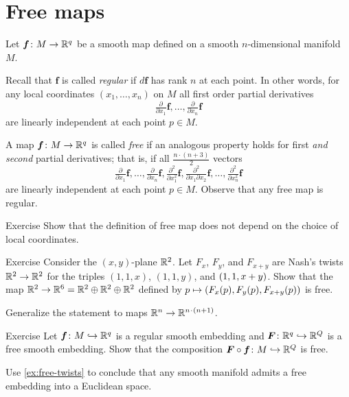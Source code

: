 \section{Free maps}

Let $\bm{f}\colon M\to \mathbb{R}^q$ be a smooth map defined on a smooth $n$-dimensional manifold $M$.

Recall that $\bm{f}$ is called \emph{regular} if $d\bm{f}$ has rank $n$ at each point.
In other words, for any local coordinates $(x_1,\dots,x_n)$ on $M$ all first order partial derivatives
\[\tfrac{\partial}{\partial x_1}\bm{f},\dots,\tfrac{\partial}{\partial x_n}\bm{f}\]
are linearly independent at each point $p\in M$.

A map $\bm{f}\colon M\to \mathbb{R}^q$ is called \emph{free} if an analogous property holds for first \emph{and second} partial derivatives;
that is, if all $\tfrac{n\cdot(n+3)}{2}$ vectors
\[\tfrac{\partial}{\partial x_1}\bm{f},
\dots,
\tfrac{\partial}{\partial x_n}\bm{f},
\tfrac{\partial^2}{\partial x_1^2}\bm{f},
\tfrac{\partial^2}{\partial x_1\partial x_2}\bm{f},
\dots,
\tfrac{\partial^2}{\partial x_n^2}\bm{f}\]
are linearly independent at each point $p\in M$.
Observe that any free map is regular.

\begin{thm}{Exercise}\label{ex:free-def}
Show that the definition of free map does not depend on the choice of local coordinates. 
\end{thm}

\begin{thm}{Exercise}\label{ex:free-twists}
Consider the $(x,y)$-plane $\mathbb{R}^2$.
Let $F_x$, $F_y$, and $F_{x+y}$ are Nash's twists $\mathbb{R}^2\to \mathbb{R}^2$ for the triples $(1,1,x)$, $(1,1,y)$, and $(1,1,x\z+y)$.
Show that the map $\mathbb{R}^2\to \mathbb{R}^6=\mathbb{R}^2\oplus\mathbb{R}^2\oplus\mathbb{R}^2$ defined by $p\z\mapsto (F_x(p), F_y(p),F_{x+y}(p))$ is free.

Generalize the statement to maps $\RR^n\to \RR^{n\cdot(n+1)}$. 
\end{thm}

\begin{thm}{Exercise}\label{ex:free-composition}
Let $\bm{f}\colon M\hookrightarrow \mathbb{R}^q$ is a regular smooth embedding and $\bm{F}\:\RR^q\z\hookrightarrow \RR^Q$ is a free smooth embedding.
Show that the composition $\bm{F}\circ\bm{f}\colon M\hookrightarrow \mathbb{R}^Q$ is free.

Use \ref{ex:free-twists} to conclude that any smooth manifold admits a free embedding into a Euclidean space.
\end{thm}




